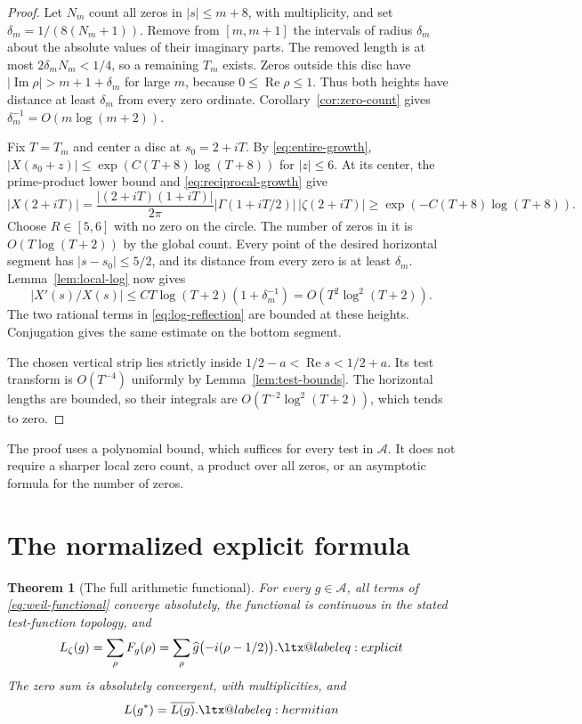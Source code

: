 \documentclass[11pt]{article}
\makeatletter
\newtheorem{theorem}{Theorem}[section]
\theoremstyle{definition}
\theoremstyle{remark}
\numberwithin{equation}{section}
\newcommand{\A}{\mathcal A}
\newcommand{\alsoeq}[1]{\ltx@label{#1}}
\makeatother
\begin{document}
\begin{proof}
Let $N_m$ count all zeros in $|s|\leq m+8$, with multiplicity, and set
$\delta_m=1/(8(N_m+1))$.
Remove from $[m,m+1]$ the intervals of radius $\delta_m$ about the absolute
values of their imaginary parts.
The removed length is at most $2\delta_mN_m<1/4$, so a remaining $T_m$ exists.
Zeros outside this disc have $|\operatorname{Im}\rho|>m+1+\delta_m$
for large $m$, because $0\leq\operatorname{Re}\rho\leq1$.
Thus both heights have distance at least $\delta_m$ from every zero ordinate.
Corollary~\ref{cor:zero-count} gives
$\delta_m^{-1}=O(m\log(m+2))$.

Fix $T=T_m$ and center a disc at $s_0=2+iT$.
By \eqref{eq:entire-growth},
$|X(s_0+z)|\leq\exp(C(T+8)\log(T+8))$ for $|z|\leq6$.
At its center, the prime-product lower bound and
\eqref{eq:reciprocal-growth} give
\[
 |X(2+iT)|
 =\frac{|(2+iT)(1+iT)|}{2\pi}
       |\Gamma(1+iT/2)|\,|\zeta(2+iT)|
 \geq\exp(-C(T+8)\log(T+8)).
\]
Choose $R\in[5,6]$ with no zero on the circle.
The number of zeros in it is $O(T\log(T+2))$ by the global count.
Every point of the desired horizontal segment has $|s-s_0|\leq5/2$,
and its distance from every zero is at least $\delta_m$.
Lemma~\ref{lem:local-log} now gives
\[
 |X'(s)/X(s)|
 \leq C T\log(T+2)(1+\delta_m^{-1})
 =O(T^2\log^2(T+2)).
\]
The two rational terms in \eqref{eq:log-reflection} are bounded at these
heights.  Conjugation gives the same estimate on the bottom segment.

The chosen vertical strip lies strictly inside
$1/2-a<\operatorname{Re}s<1/2+a$.
Its test transform is $O(T^{-4})$ uniformly by
Lemma~\ref{lem:test-bounds}.
The horizontal lengths are bounded, so their integrals are
$O(T^{-2}\log^2(T+2))$, which tends to zero.
\end{proof}

The proof uses a polynomial bound, which suffices for every test in $\A$.
It does not require a sharper local zero count, a product over all zeros,
or an asymptotic formula for the number of zeros.

\section{The normalized explicit formula}
\label{sec:formula}

\begin{theorem}[The full arithmetic functional]
\label{thm:explicit}
For every $g\in\A$, all terms of \eqref{eq:weil-functional} converge
absolutely, the functional is continuous in the stated test-function
topology, and
\begin{equation}
 L_\zeta(g)=\sum_\rho F_g(\rho)
           =\sum_\rho\widehat g\bigl(-i(\rho-1/2)\bigr).
 \label{eq:target}\alsoeq{eq:explicit}
\end{equation}
The zero sum is absolutely convergent, with multiplicities, and
\begin{equation}
 L(g^*)=\overline{L(g)}.
 \label{eq:functional}\alsoeq{eq:hermitian}
\end{equation}
\end{theorem}
\end{document}
